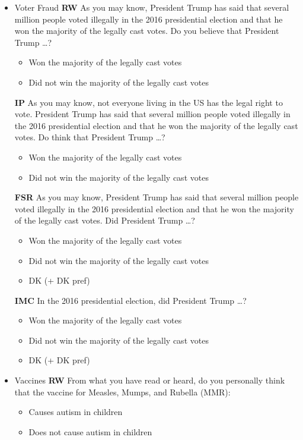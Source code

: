\begin{itemize}
\item Voter Fraud\newline
\textbf{RW}\newline
As you may know, President Trump has said that several million people voted
illegally in the 2016 presidential election and that he won the majority of the legally
cast votes. Do you believe that President Trump \ldots?
\begin{itemize}
	\item Won the majority of the legally cast votes
	\item Did not win the majority of the legally cast votes
\end{itemize}

\textbf{IP}\newline
As you may know, not everyone living in the US has the legal right to vote. President
Trump has said that several million people voted illegally in the 2016 presidential
election and that he won the majority of the legally cast votes. Do think that
President Trump \ldots?
\begin{itemize}
	\item Won the majority of the legally cast votes
	\item Did not win the majority of the legally cast votes
\end{itemize}

\textbf{FSR}\newline
As you may know, President Trump has said that several million people voted
illegally in the 2016 presidential election and that he won the majority of the legally
cast votes. Did President Trump \ldots?
\begin{itemize}
	\item Won the majority of the legally cast votes
	\item Did not win the majority of the legally cast votes
	\item DK (+ DK pref)
\end{itemize}

\textbf{IMC}\newline
In the 2016 presidential election, did President Trump \ldots?
\begin{itemize}
	\item Won the majority of the legally cast votes
	\item Did not win the majority of the legally cast votes
	\item DK (+ DK pref)
\end{itemize}

\item Vaccines\newline
\textbf{RW}\newline
From what you have read or heard, do you personally think that the vaccine for
Measles, Mumps, and Rubella (MMR):
\begin{itemize}
	\item Causes autism in children
	\item Does not cause autism in children
\end{itemize}


\end{itemize}
